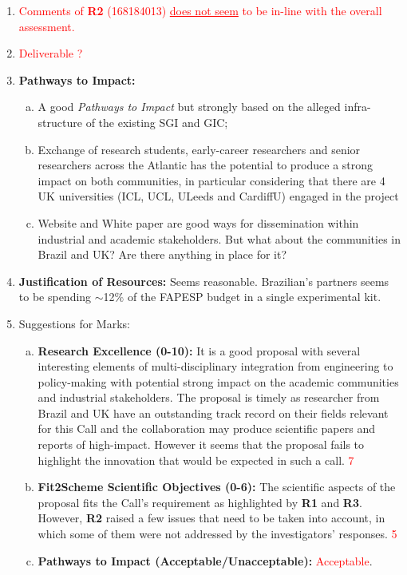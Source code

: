 \documentclass[14pt,twoside]{report}
\begin{document}
       \begin{enumerate}[1.]
          \item \textcolor{red}{Comments of {\bf R2} (168184013) \underline{does not seem} to be in-line with the overall assessment.}
%
          \item \textcolor{red}{Deliverable ?}
%
          \item {\bf Pathways to Impact:}
              \begin{enumerate}[(a)]
                 \item A good {\it Pathways to Impact} but strongly based on the alleged infra-structure of the existing SGI and GIC;
%
                 \item Exchange of research students, early-career researchers and senior researchers across the Atlantic has the potential to produce a strong impact on both communities, in particular considering that there are 4 UK universities (ICL, UCL, ULeeds and CardiffU) engaged in the project
                 \item Website and White paper are good ways for dissemination within industrial and academic stakeholders. But what about the communities in Brazil and UK? Are there anything in place for it? 
              \end{enumerate}
%
          \item {\bf Justification of Resources:} Seems reasonable. Brazilian's partners seems to be spending $\sim$12$\%$ of the FAPESP budget in a single experimental kit.
%       
          \item Suggestions for  Marks:
              \begin{enumerate}[(a)]
                 \item {\bf Research Excellence (0-10):} It is a good proposal with several interesting elements of multi-disciplinary integration from engineering to policy-making with potential strong impact on the academic communities and industrial stakeholders. The proposal is timely as researcher from Brazil and UK have an outstanding track record on their fields relevant for this Call and the collaboration may produce scientific papers and reports of high-impact. However it seems that the proposal fails to highlight the innovation that would be expected in such a call. \textcolor{red}{7}
                 \item {\bf Fit2Scheme Scientific Objectives (0-6):} The scientific aspects of the proposal fits the Call's requirement as highlighted by {\bf R1} and {\bf R3}. However, {\bf R2} raised a few issues that need to be taken into account, in which some of them were not addressed by the investigators' responses. \textcolor{red}{5}
                 \item {\bf Pathways to Impact (Acceptable/Unacceptable):} \textcolor{red}{Acceptable}.
              \end{enumerate}
%
       \end{enumerate}
\end{document}
